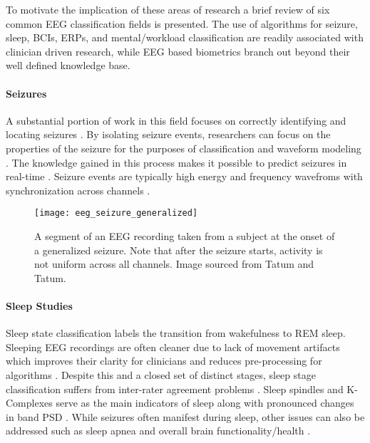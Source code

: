 To motivate the implication of these areas of research a brief review of six common \ac{EEG} classification fields is presented. The use of algorithms for seizure, sleep, \acp{BCI}, \acp{ERP}, and mental/workload classification are readily associated with clinician driven research, while \ac{EEG} based biometrics branch out beyond their well defined knowledge base.

\paragraph*{Seizures}
A substantial portion of work in this field focuses on correctly identifying and locating seizures \cite{Gardner2007,Subasi2007,Wulsin2012,Bogaarts2016}. By isolating seizure events, researchers can focus on the properties of the seizure for the purposes of classification and waveform modeling \cite{Wulsin2011,Blanco2011,Bajaj2012}. The knowledge gained in this process makes it possible to predict seizures in real-time \cite{Ramgopal2014,Chu2017}. Seizure events are typically high energy and frequency wavefroms with synchronization across channels \cite{Halford2015}.

\begin{figure}[h]
\centering
\texttt{[image: eeg\_seizure\_generalized]}
\caption[Example of a generalized seizure EEG]{A segment of an \ac{EEG} recording taken from a subject at the onset of a generalized seizure. Note that after the seizure starts, activity is not uniform across all channels. Image sourced from Tatum and Tatum\cite{Tatum2014}. }
\label{fig:seizureExample}
\end{figure}

\paragraph*{Sleep Studies}
Sleep state classification labels the transition from wakefulness to \ac{REM} sleep. Sleeping \ac{EEG} recordings are often cleaner due to lack of movement artifacts which improves their clarity for clinicians and reduces pre-processing for algorithms \cite{Buckelmuller2006}. Despite this and a closed set of distinct stages, sleep stage classification suffers from inter-rater agreement problems \cite{Warby2014}. Sleep spindles and K-Complexes serve as the main indicators of sleep along with pronounced changes in band \acl{PSD} \cite{Wendt2012}. While seizures often manifest during sleep, other issues can also be addressed such as sleep apnea \cite{Schluter2012} and overall brain functionality/health \cite{Zygierewicz1999}.

